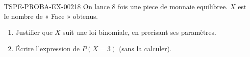 \begin{exercice}{TSPE-PROBA-EX-002}{1}{8}
On lance $8$ fois une piece de monnaie equilibree. $X$ est le nombre de « Face » obtenus.
\begin{enumerate}
  \item Justifier que $X$ suit une loi binomiale, en precisant ses paramètres.
  \item Écrire l'expression de $P(X=3)$ (sans la calculer).
\end{enumerate}
\end{exercice}
